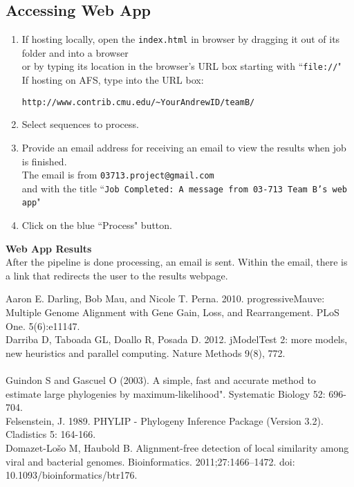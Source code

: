 \documentclass[11pt]{article}
\begin{document}
\subsection{Accessing Web App}

\begin{enumerate}
	\item If hosting locally, open the \texttt{index.html} in browser by dragging it out of its folder and into a browser
	\\or by typing its location in the browser's URL box starting with ``\texttt{file://}"\\
	If hosting on AFS, type into the URL box:
	\begin{verbatim}http://www.contrib.cmu.edu/~YourAndrewID/teamB/
	\end{verbatim}
	\item Select sequences to process.
	\item Provide an email address for receiving an email to view the results when job is finished.\\
		The email is from \texttt{03713.project@gmail.com}\\
		and with the title ``\texttt{Job Completed: A message from 03-713 Team B's web app}"
	\item Click on the blue ``Process" button.
\end{enumerate}
\bigskip

\textbf{Web App Results}\\
After the pipeline is done processing, an email is sent. Within the email, there is a link that redirects the user to the results webpage.

\newpage
\begin{thebibliography}{9}
Aaron E. Darling, Bob Mau, and Nicole T. Perna. 2010.  progressiveMauve: Multiple Genome Alignment with Gene Gain, Loss, and Rearrangement.  PLoS One.  5(6):e11147. \\
Darriba D, Taboada GL, Doallo R, Posada D. 2012. jModelTest 2: more models, new heuristics and parallel computing. Nature Methods 9(8), 772.\\\\
Guindon S and Gascuel O (2003). A simple, fast and accurate method to estimate large phylogenies by maximum-likelihood". Systematic Biology 52: 696-704.\\
Felsenstein, J. 1989. PHYLIP - Phylogeny Inference Package (Version 3.2). Cladistics 5: 164-166. \\
Domazet-Lošo M, Haubold B. Alignment-free detection of local similarity among viral and bacterial genomes. Bioinformatics. 2011;27:1466–1472. doi: 10.1093/bioinformatics/btr176.
\end{thebibliography}
\end{document}
